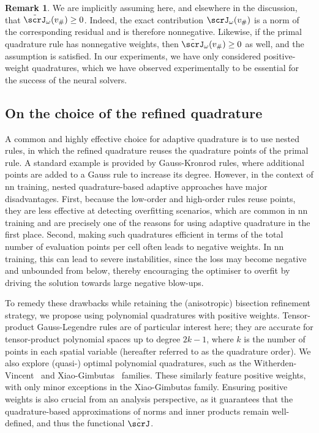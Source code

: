 \documentclass[oneside,reqno,11pt,a4paper]{amsart}
\theoremstyle{definition}
\newtheorem{remark}{Remark}[section]
\begin{document}
\begin{remark}
We are implicitly assuming here, and elsewhere in the discussion, that
$\tilde \scrJ_\omega(v_{\#}) \geq 0$. Indeed, the exact contribution
$\scrJ_\omega(v_{\#})$ is a norm of the corresponding residual and is therefore
nonnegative. Likewise, if the primal quadrature rule has nonnegative weights,
then $\tilde \scrJ_\omega(v_{\#}) \geq 0$ as well, and the assumption is satisfied. 
In our experiments, we have only considered positive-weight quadratures, which we have observed experimentally to be essential for the success of the neural solvers.
\end{remark}
\subsection{On the choice of the refined quadrature}

A common and highly effective choice for adaptive quadrature is to use nested rules, in which the refined quadrature reuses the quadrature points of the primal rule. A standard example is provided by Gauss-Kronrod rules, where additional points are added to a Gauss rule to increase its degree. However, in the context of \ac{nn} training, nested quadrature-based adaptive approaches have major disadvantages. First, because the low-order and high-order rules reuse points, they are less effective at detecting overfitting scenarios, which are common in \ac{nn} training and are precisely one of the reasons for using adaptive quadrature in the first place. Second, making such quadratures efficient in terms of the total number of evaluation points per cell often leads to negative weights. In \ac{nn} training, this can lead to severe instabilities, since the loss may become negative and unbounded from below, thereby encouraging the optimiser to overfit by driving the solution towards large negative blow-ups.

To remedy these drawbacks while retaining the (anisotropic) bisection refinement strategy, we propose using polynomial quadratures with positive weights. Tensor-product Gauss-Legendre rules are of particular interest here; they are accurate for tensor-product polynomial spaces up to degree $2k - 1$, where $k$ is the number of points in each spatial variable (hereafter referred to as the quadrature order). We also explore (quasi-) optimal polynomial quadratures, such as the Witherden-Vincent~\cite{WitherdenVincent2015} and Xiao-Gimbutas~\cite{XiaoGimbutas2010} families. These similarly feature positive weights, with only minor exceptions in the Xiao-Gimbutas family. Ensuring positive weights is also crucial from an analysis perspective, as it guarantees that the quadrature-based approximations of norms and inner products remain well-defined, and thus the functional $\tilde\scrJ$.
\end{document}
